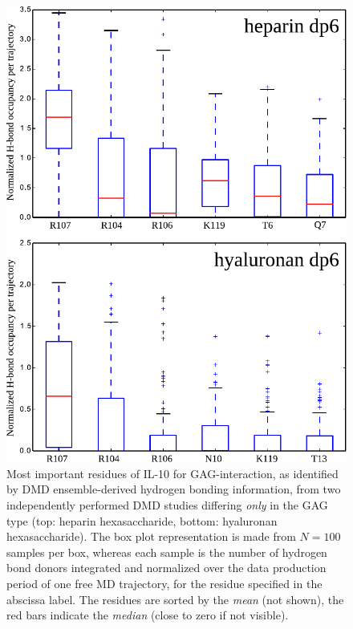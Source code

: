 \begin{figure}
\centering
\includegraphics[width=1.0\textwidth]{gfx/dmdil10/round1_il10_hbond_hadp6_vs_hpdp6.pdf}
\caption[]{Most important residues of IL-10 for GAG-interaction, as identified
by DMD ensemble-derived hydrogen bonding information, from two independently
performed DMD studies differing \textit{only} in the GAG type (top: heparin
hexasaccharide, bottom: hyaluronan hexasaccharide). The box plot representation
is made from  $N=100$ samples per box, whereas each sample is the number of
hydrogen bond donors integrated and normalized over the data production period
of one free MD trajectory, for the residue specified in the abscissa label.
The residues are sorted by the \textit{mean} (not shown), the red bars indicate
the \textit{median} (close to zero if not visible).}
\label{fig:dmdil10:hp_hexa_vs_ha_hexa_hbond}
\end{figure}


